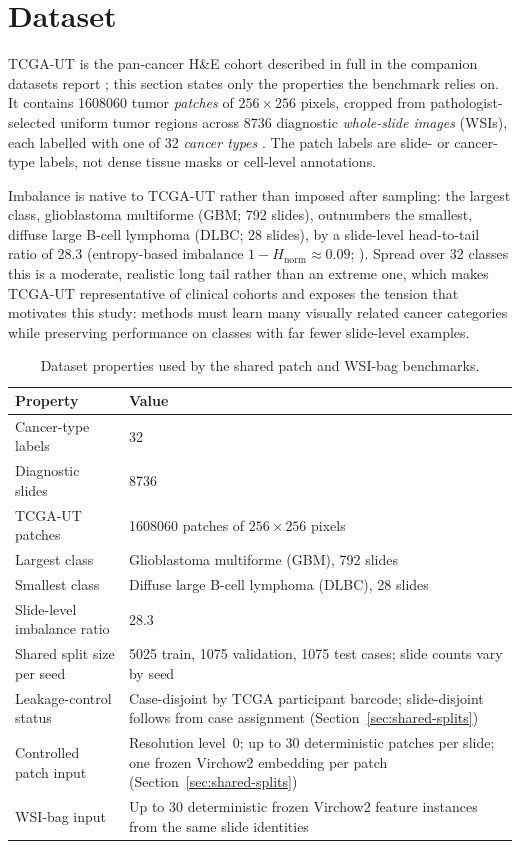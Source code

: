 \documentclass[11pt]{article}
\begin{document}
\section{Dataset}
TCGA-UT is the pan-cancer H\&E cohort described in full in the companion datasets report \citep{queisler2026datasets}; this section states only the properties the benchmark relies on. It contains \num{1608060} tumor \emph{patches} of $256\times256$ pixels, cropped from pathologist-selected uniform tumor regions across \num{8736} diagnostic \emph{whole-slide images} (WSIs), each labelled with one of \num{32} \emph{cancer types} \citep{tomczak2015reviewThe,komura2022universalEncoding}. The patch labels are slide- or cancer-type labels, not dense tissue masks or cell-level annotations.

Imbalance is native to TCGA-UT rather than imposed after sampling: the largest class, glioblastoma multiforme (GBM; 792 slides), outnumbers the smallest, diffuse large B-cell lymphoma (DLBC; 28 slides), by a slide-level head-to-tail ratio of \num{28.3} (entropy-based imbalance $1-H_{\mathrm{norm}}\approx\num{0.09}$; \citealp{queisler2026datasets}). Spread over 32 classes this is a moderate, realistic long tail rather than an extreme one, which makes TCGA-UT representative of clinical cohorts and exposes the tension that motivates this study: methods must learn many visually related cancer categories while preserving performance on classes with far fewer slide-level examples.

\begin{table}[ht]
  \centering
  \small
  \begin{tabularx}{\linewidth}{@{}lX@{}}
    \toprule
    Property & Value\\
    \midrule
    Cancer-type labels & 32\\
    Diagnostic slides & \num{8736}\\
    TCGA-UT patches & \num{1608060} patches of $256\times256$ pixels\\
    Largest class & Glioblastoma multiforme (GBM), 792 slides\\
    Smallest class & Diffuse large B-cell lymphoma (DLBC), 28 slides\\
    Slide-level imbalance ratio & \num{28.3}\\
    Shared split size per seed & \num{5025} train, \num{1075} validation, \num{1075} test cases; slide counts vary by seed\\
    Leakage-control status & Case-disjoint by TCGA participant barcode; slide-disjoint follows from case assignment (Section~\ref{sec:shared-splits})\\
    Controlled patch input & Resolution level~0; up to 30 deterministic patches per slide; one frozen Virchow2 embedding per patch (Section~\ref{sec:shared-splits})\\
    WSI-bag input & Up to 30 deterministic frozen Virchow2 feature instances from the same slide identities\\
    \bottomrule
  \end{tabularx}
  \caption{Dataset properties used by the shared patch and WSI-bag benchmarks.}
  \label{tab:dataset-summary}
\end{table}
\end{document}
